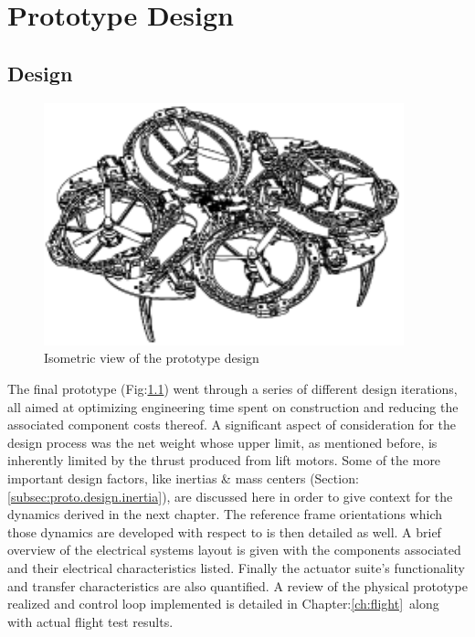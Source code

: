 \chapter{Prototype Design}
\label{ch:proto}
\section{Design}
\label{sec:proto.design}
\begin{figure}[htbp]
\centering
\includegraphics[width=0.93\textwidth]{figs/iso-design}
\caption{Isometric view of the prototype design}
\label{fig:iso-design}
\end{figure}
The final prototype (Fig:\ref{fig:iso-design}) went through a series of different design iterations, all aimed at optimizing engineering time spent on construction and reducing the associated component costs thereof. A significant aspect of consideration for the design process was the net weight whose upper limit, as mentioned before, is inherently limited by the thrust produced from lift motors. Some of the more important design factors, like inertias \& mass centers (Section:\ref{subsec:proto.design.inertia}), are discussed here in order to give context for the dynamics derived in the next chapter. The reference frame orientations which those dynamics are developed with respect to is then detailed as well. A brief overview of the electrical systems layout is given with the components associated and their electrical characteristics listed. Finally the actuator suite's functionality and transfer characteristics are also quantified. A review of the physical prototype realized and control loop implemented is detailed in Chapter:\ref{ch:flight}~along with actual flight test results.
\newpage
